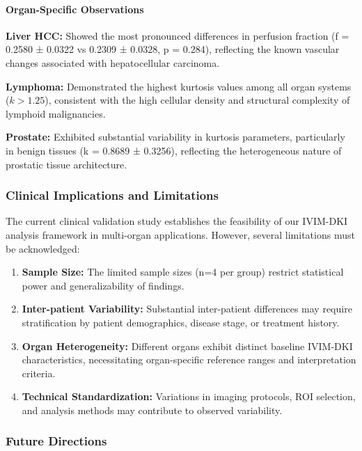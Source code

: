 \documentclass[a4paper,12pt]{article}
\begin{document}
\paragraph{Organ-Specific Observations}

\textbf{Liver HCC:} Showed the most pronounced differences in perfusion fraction (f = 0.2580 ± 0.0322 vs 0.2309 ± 0.0328, p = 0.284), reflecting the known vascular changes associated with hepatocellular carcinoma.

\textbf{Lymphoma:} Demonstrated the highest kurtosis values among all organ systems ($k > 1.25$), consistent with the high cellular density and structural complexity of lymphoid malignancies.

\textbf{Prostate:} Exhibited substantial variability in kurtosis parameters, particularly in benign tissues (k = 0.8689 ± 0.3256), reflecting the heterogeneous nature of prostatic tissue architecture.

\subsubsection{Clinical Implications and Limitations}

The current clinical validation study establishes the feasibility of our IVIM-DKI analysis framework in multi-organ applications. However, several limitations must be acknowledged:

\begin{enumerate}
    \item \textbf{Sample Size:} The limited sample sizes (n=4 per group) restrict statistical power and generalizability of findings.
    
    \item \textbf{Inter-patient Variability:} Substantial inter-patient differences may require stratification by patient demographics, disease stage, or treatment history.
    
    \item \textbf{Organ Heterogeneity:} Different organs exhibit distinct baseline IVIM-DKI characteristics, necessitating organ-specific reference ranges and interpretation criteria.
    
    \item \textbf{Technical Standardization:} Variations in imaging protocols, ROI selection, and analysis methods may contribute to observed variability.
\end{enumerate}

\subsubsection{Future Directions}
\end{document}
